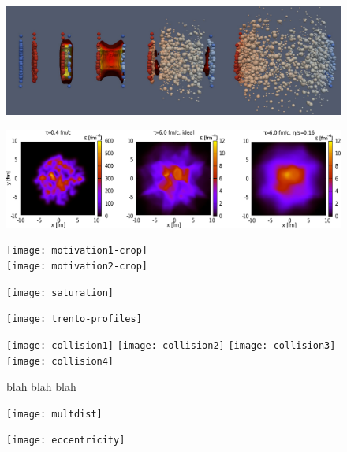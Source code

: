\documentclass[aps,prc,reprint,amsmath,nofootinbib]{revtex4-1}
\begin{document}
\begin{figure}
 \includegraphics[width=\columnwidth]{HIC}
\end{figure}

\begin{figure}
 \includegraphics[width=\textwidth]{three}
\end{figure}

\begin{figure}
 \texttt{[image: motivation1-crop]}\\
 \texttt{[image: motivation2-crop]}
\end{figure}

\begin{figure}
 \texttt{[image: saturation]}
\end{figure}

\begin{figure}
 \texttt{[image: trento-profiles]}
\end{figure}

\begin{figure}
 \texttt{[image: collision1]}
 \texttt{[image: collision2]}
 \texttt{[image: collision3]}
 \texttt{[image: collision4]}
 \caption{\label{fig:spacetime} blah blah blah}
\end{figure}

\begin{figure}
 \texttt{[image: multdist]}
\end{figure}

\begin{figure}
 \texttt{[image: eccentricity]}
\end{figure}


\end{document}
